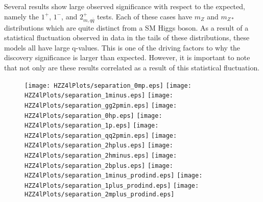 Several results show large observed significance with respect to 
the expected, namely the $1^+$, $1^-$, and $2_{m,q\bar{q}}^+$ tests.
Each of these cases have $m_{Z}$ and $m_{Z*}$ distributions which 
are quite distinct from a SM Higgs boson.  As a result of a 
statistical
fluctuation observed in data in the tails of these distributions,
these models all have large q-values.  This is one of the driving
factors to why the discovery significance is larger than expected.
However, it is important
to note that not only are these results correlated as a result
of this statistical fluctuation.

\begin{figure}
\begin{center}
\texttt{[image: HZZ4lPlots/separation\_0mp.eps]}
\texttt{[image: HZZ4lPlots/separation\_1minus.eps]}
\texttt{[image: HZZ4lPlots/separation\_gg2pmin.eps]}
\texttt{[image: HZZ4lPlots/separation\_0hp.eps]}
\texttt{[image: HZZ4lPlots/separation\_1p.eps]}
\texttt{[image: HZZ4lPlots/separation\_qq2pmin.eps]}
\texttt{[image: HZZ4lPlots/separation\_2hplus.eps]}
\texttt{[image: HZZ4lPlots/separation\_2hminus.eps]}
\texttt{[image: HZZ4lPlots/separation\_2bplus.eps]}
\texttt{[image: HZZ4lPlots/separation\_1minus\_prodind.eps]}
\texttt{[image: HZZ4lPlots/separation\_1plus\_prodind.eps]}
\texttt{[image: HZZ4lPlots/separation\_2mplus\_prodind.eps]}
\caption{}
\label{fig:HZZ4lhypothTests}
\end{center}
\end{figure}


